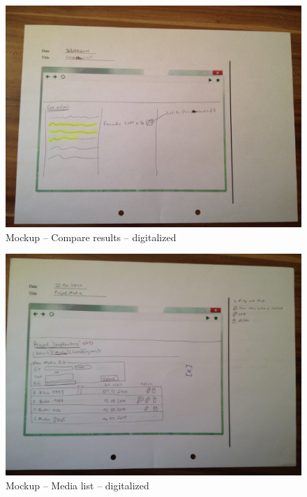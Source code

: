 \begin{appendix}
\begin{figure}[!h]
  \centering
    \includegraphics[width=\textwidth]{mockups/m_compare_result.jpg}
  \caption{Mockup – Compare results – digitalized }
  \label{fig:mCompareResultsMockup}
\end{figure}

\begin{figure}[!h]
  \centering
    \includegraphics[width=\textwidth]{mockups/m_media_list.jpg}
  \caption{Mockup – Media list – digitalized }
  \label{fig:mMediaListMockup}
\end{figure}


\end{appendix}
